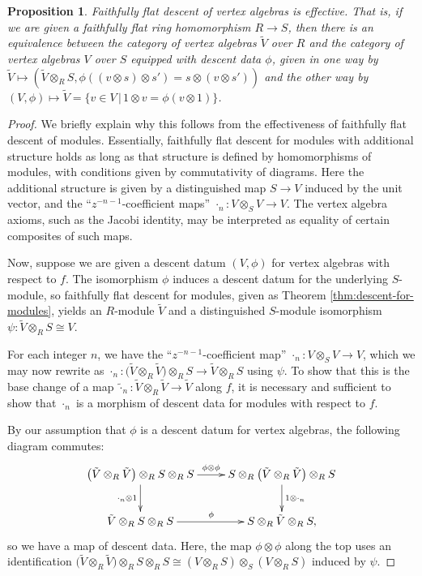 \documentclass[pdftex]{sigma}
\newtheorem{prop}[thm]{Proposition}
\theoremstyle{definition}
\begin{document}
\begin{prop} \label{prop:descent-for-vertex-algebras}Faithfully flat descent of vertex algebras is effective. That is, if we are given a faithfully flat ring homomorphism $R \to S$, then there is an equivalence between the category of vertex algebras $\tilde{V}$ over $R$ and the category of vertex algebras $V$ over $S$ equipped with descent data $\phi$, given in one way by $\tilde{V} \mapsto (\tilde{V} \otimes_{R} S, \phi((v \otimes s) \otimes s') = s \otimes (v \otimes s'))$ and the other way by $(V, \phi) \mapsto \tilde{V} = \{v \in V \,|\, 1 \otimes v = \phi(v \otimes 1)\}$.
\end{prop}
\begin{proof} We briefly explain why this follows from the effectiveness of faithfully flat descent of modules. Essentially, faithfully flat descent for modules with additional structure holds as long as that structure is defined by homomorphisms of modules, with conditions given by commutativity of diagrams. Here the additional structure is given by a distinguished map $S \to V$ induced by the unit vector, and the ``$z^{-n-1}$-coefficient maps'' $\cdot_n\colon V \otimes_S V \to V$. The vertex algebra axioms, such as the Jacobi identity, may be interpreted as equality of certain composites of such maps.

Now, suppose we are given a descent datum $(V, \phi)$ for vertex algebras with respect to $f$. The isomorphism $\phi$ induces a descent datum for the underlying $S$-module, so faithfully flat descent for modules, given as Theorem \ref{thm:descent-for-modules}, yields an $R$-module $\tilde{V}$ and a distinguished $S$-module isomorphism $\psi\colon \tilde{V} \otimes_{R} S \cong V$.

For each integer $n$, we have the ``$z^{-n-1}$-coefficient map'' $\cdot_n\colon V \otimes_S V \to V$, which we may now rewrite as $\cdot_n\colon \big(\tilde{V} \otimes_{R} \tilde{V}\big) \otimes_{R} S \to \tilde{V} \otimes_{R} S$ using $\psi$. To show that this is the base change of a map $\tilde{\cdot}_n\colon \tilde{V} \otimes_{R} \tilde{V} \to \tilde{V}$ along $f$, it is necessary and sufficient to show that $\cdot_n$ is a morphism of descent data for modules with respect to $f$.

By our assumption that $\phi$ is a descent datum for vertex algebras, the following diagram commutes:
\begin{gather*} \xymatrix{ \big(\tilde{V} \otimes_{R} \tilde{V}\big) \otimes_{R} S \otimes_{R} S \ar[r]^{\phi \otimes \phi} \ar[d]_{\cdot_n \otimes 1} & S \otimes_{R} \big(\tilde{V} \otimes_{R} \tilde{V}\big) \otimes_{R} S \ar[d]^{1 \otimes \cdot_n} \\
\tilde{V} \otimes_{R} S \otimes_{R} S \ar[r]^{\phi} & S \otimes_{R} \tilde{V} \otimes_{R} S,} \end{gather*}
so we have a map of descent data. Here, the map $\phi \otimes \phi$ along the top uses an identification $\big(\tilde{V} \otimes_{R} \tilde{V}\big) \otimes_{R} S \otimes_{R} S \cong (V \otimes_{R} S) \otimes_S (V \otimes_{R} S)$ induced by $\psi$.


\end{proof}
\end{document}
